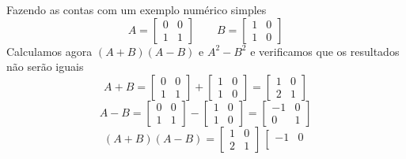 \begin{exemplos}
\begin{exemplo}
        Fazendo as contas com um exemplo numérico simples
        \[ A = \left[\begin{array}{cc}
            0 & 0 \\ 
            1 & 1
            \end{array} \right] 
            \qquad
            B = \left[\begin{array}{cc}
            1 & 0 \\ 
            1 & 0
            \end{array} \right] 
        \]
        Calculamos agora $(A+B)(A-B)$ e $A^2 - B^2$ e verificamos que os resultados não serão iguais
        \[ A+B = \left[\begin{array}{cc}
                0 & 0 \\ 
                1 & 1
                \end{array} \right] 
                +
                \left[\begin{array}{cc}
                1 & 0 \\ 
                1 & 0
                \end{array} \right]
              = \left[\begin{array}{cc}
                1 & 0 \\ 
                2 & 1
                \end{array} \right]  
        \]
        \[ A-B = \left[\begin{array}{cc}
                0 & 0 \\ 
                1 & 1
                \end{array} \right] 
                -
                \left[\begin{array}{cc}
                1 & 0 \\ 
                1 & 0
                \end{array} \right]
              = \left[\begin{array}{rc}
                -1 & 0 \\ 
                 0 & 1
                \end{array} \right]  
        \]    
        \[ (A+B)(A-B) = \left[\begin{array}{cc}
                1 & 0 \\ 
                2 & 1
                \end{array} \right]
                \,
                \left[\begin{array}{rc}
                -1 & 0 \\ 

\end{array}\]
\end{exemplo}
\end{exemplos}
